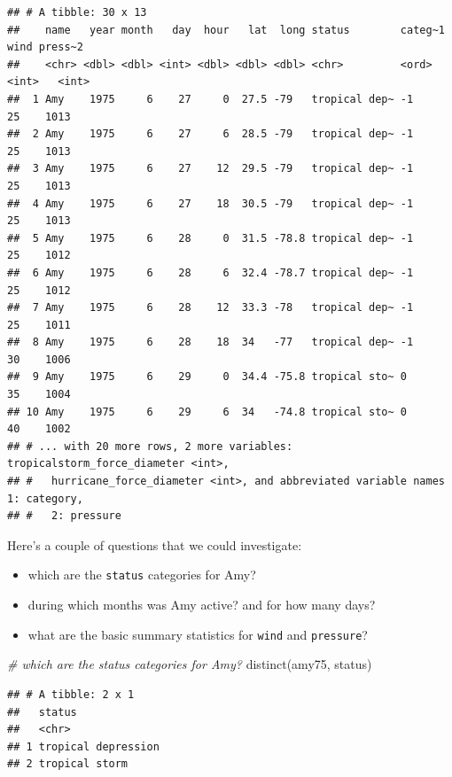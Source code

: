 \documentclass[
]{book}
\newenvironment{Shaded}{\begin{snugshade}}{\end{snugshade}}
\newcommand{\CommentTok}[1]{\textcolor[rgb]{0.56,0.35,0.01}{\textit{#1}}}
\newcommand{\FunctionTok}[1]{\textcolor[rgb]{0.00,0.00,0.00}{#1}}
\newcommand{\NormalTok}[1]{#1}
\begin{document}
\begin{verbatim}
## # A tibble: 30 x 13
##    name   year month   day  hour   lat  long status        categ~1  wind press~2
##    <chr> <dbl> <dbl> <int> <dbl> <dbl> <dbl> <chr>         <ord>   <int>   <int>
##  1 Amy    1975     6    27     0  27.5 -79   tropical dep~ -1         25    1013
##  2 Amy    1975     6    27     6  28.5 -79   tropical dep~ -1         25    1013
##  3 Amy    1975     6    27    12  29.5 -79   tropical dep~ -1         25    1013
##  4 Amy    1975     6    27    18  30.5 -79   tropical dep~ -1         25    1013
##  5 Amy    1975     6    28     0  31.5 -78.8 tropical dep~ -1         25    1012
##  6 Amy    1975     6    28     6  32.4 -78.7 tropical dep~ -1         25    1012
##  7 Amy    1975     6    28    12  33.3 -78   tropical dep~ -1         25    1011
##  8 Amy    1975     6    28    18  34   -77   tropical dep~ -1         30    1006
##  9 Amy    1975     6    29     0  34.4 -75.8 tropical sto~ 0          35    1004
## 10 Amy    1975     6    29     6  34   -74.8 tropical sto~ 0          40    1002
## # ... with 20 more rows, 2 more variables: tropicalstorm_force_diameter <int>,
## #   hurricane_force_diameter <int>, and abbreviated variable names 1: category,
## #   2: pressure
\end{verbatim}

Here's a couple of questions that we could investigate:

\begin{itemize}
\item
  which are the \texttt{status} categories for Amy?
\item
  during which months was Amy active? and for how many days?
\item
  what are the basic summary statistics for \texttt{wind} and \texttt{pressure}?
\end{itemize}

\begin{Shaded}
\begin{Highlighting}[]
\CommentTok{\# which are the \textasciigrave{}status\textasciigrave{} categories for Amy?}
\FunctionTok{distinct}\NormalTok{(amy75, status)}
\end{Highlighting}
\end{Shaded}

\begin{verbatim}
## # A tibble: 2 x 1
##   status             
##   <chr>              
## 1 tropical depression
## 2 tropical storm
\end{verbatim}
\end{document}
